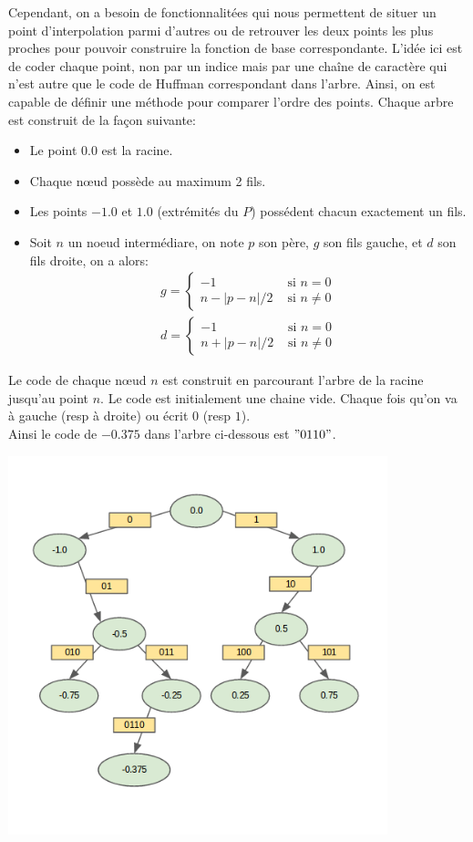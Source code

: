 \begin{itemize}
Cependant, on a besoin de fonctionnalitées qui nous permettent de situer un point d'interpolation parmi d'autres ou de retrouver les deux points les plus proches pour pouvoir construire la fonction
de base correspondante. L'idée ici est de coder chaque point, non par un indice mais par une chaîne de caractère qui n'est autre que le code de Huffman correspondant dans l'arbre.
Ainsi, on est capable de définir une méthode pour comparer l'ordre des points. Chaque arbre est construit de la façon suivante:
\begin{itemize}
\item Le point $0.0$ est la racine.
\item Chaque nœud possède au maximum 2 fils.
\item Les points $-1.0$ et $1.0$ (extrémités du $P$) possédent chacun exactement un fils.
\item Soit $n$ un noeud intermédiare, on note $p$ son père, $g$ son fils gauche, et $d$ son fils droite, on a alors:
\begin{align}
g =
\begin{cases}
 -1 & \text{ si } n=0 \\
 n-\left | p-n \right |/2 & \text{ si } n\neq0
\end{cases}
\\
d =
\begin{cases}
 -1 & \text{ si } n=0 \\
 n+\left | p-n \right |/2 & \text{ si } n\neq0
\end{cases}
\end{align}
\end{itemize}
Le code de chaque nœud $n$ est construit en parcourant l'arbre de la racine jusqu'au point $n$.
Le code est initialement une chaine vide. Chaque fois qu'on va à gauche (resp à droite) ou écrit $0$ (resp $1$).\\
Ainsi le code de $-0.375$ dans l'arbre ci-dessous est $"0110"$.\\
\begin{center}
\includegraphics[height= 11cm,width = 11cm]{images/huffman.png}

\end{center}
\end{itemize}
